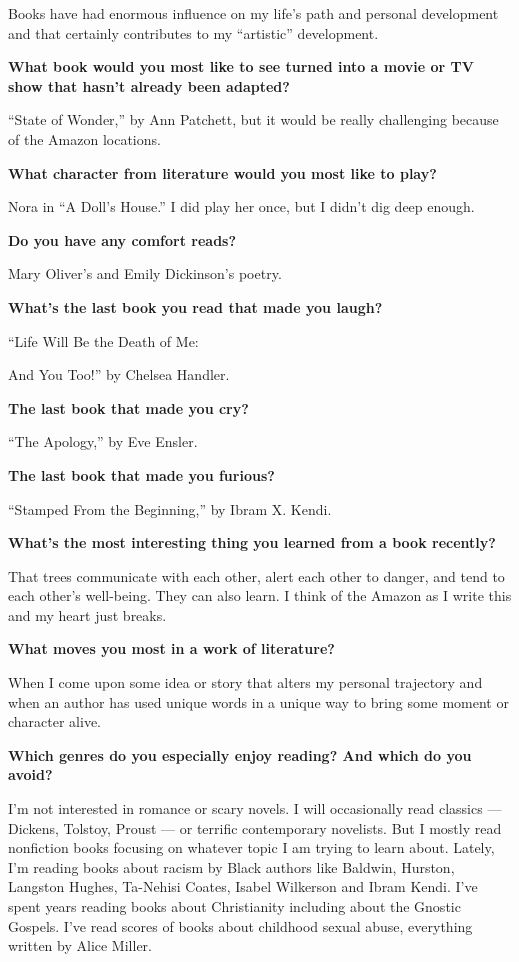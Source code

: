 Books have had enormous influence on my life's path and personal
development and that certainly contributes to my ``artistic''
development.

\textbf{What book would you most like to see turned into a movie or TV
show that hasn't already been adapted?}

``State of Wonder,'' by Ann Patchett, but it would be really challenging
because of the Amazon locations.

\textbf{What character from literature would you most like to play?}

Nora in ``A Doll's House.'' I did play her once, but I didn't dig deep
enough.

\textbf{Do you have any comfort reads?}

Mary Oliver's and Emily Dickinson's poetry.

\textbf{What's the last book you read that made you laugh?}

``Life Will Be the Death of Me:

And You Too!'' by Chelsea Handler.

\textbf{The last book that made you cry?}

``The Apology,'' by Eve Ensler.

\textbf{The last book that made you furious?}

``Stamped From the Beginning,'' by Ibram X. Kendi.

\textbf{What's the most interesting thing you learned from a book
recently?}

That trees communicate with each other, alert each other to danger, and
tend to each other's well-being. They can also learn. I think of the
Amazon as I write this and my heart just breaks.

\textbf{What moves you most in a work of literature?}

When I come upon some idea or story that alters my personal trajectory
and when an author has used unique words in a unique way to bring some
moment or character alive.

\textbf{Which genres do you especially enjoy reading? And which do you
avoid?}

I'm not interested in romance or scary novels. I will occasionally read
classics --- Dickens, Tolstoy, Proust --- or terrific contemporary
novelists. But I mostly read nonfiction books focusing on whatever topic
I am trying to learn about. Lately, I'm reading books about racism by
Black authors like Baldwin, Hurston, Langston Hughes, Ta-Nehisi Coates,
Isabel Wilkerson and Ibram Kendi. I've spent years reading books about
Christianity including about the Gnostic Gospels. I've read scores of
books about childhood sexual abuse, everything written by Alice Miller.

